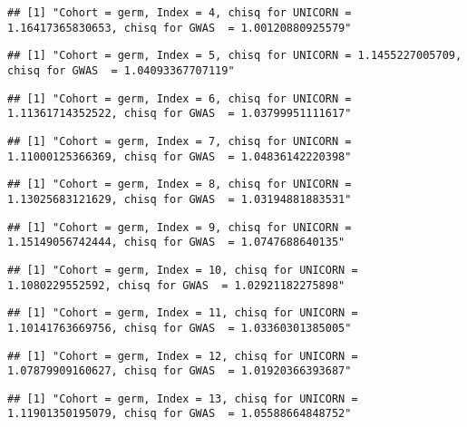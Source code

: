 \documentclass[]{article}
\begin{document}
\begin{verbatim}
## [1] "Cohort = germ, Index = 4, chisq for UNICORN = 1.16417365830653, chisq for GWAS  = 1.00120880925579"
\end{verbatim}

\begin{verbatim}
## [1] "Cohort = germ, Index = 5, chisq for UNICORN = 1.1455227005709, chisq for GWAS  = 1.04093367707119"
\end{verbatim}

\begin{verbatim}
## [1] "Cohort = germ, Index = 6, chisq for UNICORN = 1.11361714352522, chisq for GWAS  = 1.03799951111617"
\end{verbatim}

\begin{verbatim}
## [1] "Cohort = germ, Index = 7, chisq for UNICORN = 1.11000125366369, chisq for GWAS  = 1.04836142220398"
\end{verbatim}

\begin{verbatim}
## [1] "Cohort = germ, Index = 8, chisq for UNICORN = 1.13025683121629, chisq for GWAS  = 1.03194881883531"
\end{verbatim}

\begin{verbatim}
## [1] "Cohort = germ, Index = 9, chisq for UNICORN = 1.15149056742444, chisq for GWAS  = 1.0747688640135"
\end{verbatim}

\begin{verbatim}
## [1] "Cohort = germ, Index = 10, chisq for UNICORN = 1.1080229552592, chisq for GWAS  = 1.02921182275898"
\end{verbatim}

\begin{verbatim}
## [1] "Cohort = germ, Index = 11, chisq for UNICORN = 1.10141763669756, chisq for GWAS  = 1.03360301385005"
\end{verbatim}

\begin{verbatim}
## [1] "Cohort = germ, Index = 12, chisq for UNICORN = 1.07879909160627, chisq for GWAS  = 1.01920366393687"
\end{verbatim}

\begin{verbatim}
## [1] "Cohort = germ, Index = 13, chisq for UNICORN = 1.11901350195079, chisq for GWAS  = 1.05588664848752"
\end{verbatim}
\end{document}
